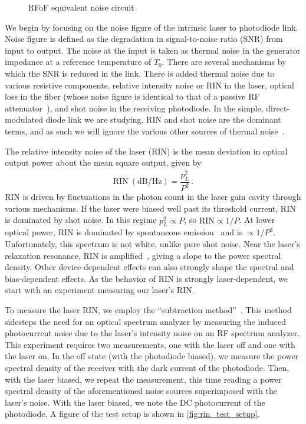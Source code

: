 \begin{figure}[ht!]
    \centering
    
    \caption{RFoF equivalent noise circuit}
    \label{fig:rfof_noise}
\end{figure}

We begin by focusing on the noise figure of the intrinsic laser to photodiode link.
Noise figure is defined as the degradation in signal-to-noise ratio (SNR) from input to output.
The noise at the input is taken as thermal noise in the generator impedance at a reference temperature of $T_0$.
There are several mechanisms by which the SNR is reduced in the link.
There is added thermal noise due to various resistive components, relative intensity noise or RIN in the laser, optical loss in the fiber (whose noise figure is identical to that of a passive RF attenuator~\cite{coxRelationshipGainNoise1996}), and shot noise in the receiving photodiode.
In the simple, direct-modulated diode link we are studying, RIN and shot noise are the dominant terms, and as such we will ignore the various other sources of thermal noise~\cite{coxLimitsPerformanceRFoverfiber2006}.

The relative intensity noise of the laser (RIN) is the mean deviation in optical output power about the mean square output, given by
\begin{equation}
    \text{RIN}~(\text{dB/Hz}) = \frac{\overline{p_L^2}}{P^2} \,.
\end{equation}
RIN is driven by fluctuations in the photon count in the laser gain cavity through various mechanisms.
If the laser were biased well past its threshold current, RIN is dominated by shot noise.
In this regime $\overline{p_L^2}\propto P$, so $\text{RIN}\propto1/P$.
At lower optical power, RIN is dominated by spontaneous emission~\cite{haugTheoryNoiseSemiconductor1967} and is $\propto 1/P^3$.
Unfortunately, this spectrum is not white, unlike pure shot noise.
Near the laser's relaxation resonance, RIN is amplified~\cite{huiChapter1Fundamentals2023}, giving a slope to the power spectral density.
Other device-dependent effects can also strongly shape the spectral and bias-dependent effects.
As the behavior of RIN is strongly laser-dependent, we start with an experiment measuring our laser's RIN.

To measure the laser RIN, we employ the ``subtraction method''~\cite{kashevskyMethodsMeasuringRelative2023}.
This method sidesteps the need for an optical spectrum analyzer by measuring the induced photocurrent noise due to the laser's intensity noise on an RF spectrum analyzer.
This experiment requires two measurements, one with the laser off and one with the laser on.
In the off state (with the photodiode biased), we measure the power spectral density of the receiver with the dark current of the photodiode.
Then, with the laser biased, we repeat the measurement, this time reading a power spectral density of the aforementioned noise sources superimposed with the laser's noise.
With the laser biased, we note the DC photocurrent of the photodiode.
A figure of the test setup is shown in \autoref{fig:rin_test_setup}.

